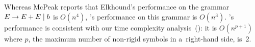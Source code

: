 Whereas McPeak reports that
Elkhound's performance on the grammar $E \rightarrow E + E \mid b$
is $O(n^4)$,
\menhir's performance on this grammar is $O(n^3)$.
\menhir's performance is consistent
with our time complexity analysis~():
it is $O(n^{p+1})$ where $p$,
the maximum number of non-rigid symbols in a~right-hand side, is~2.











